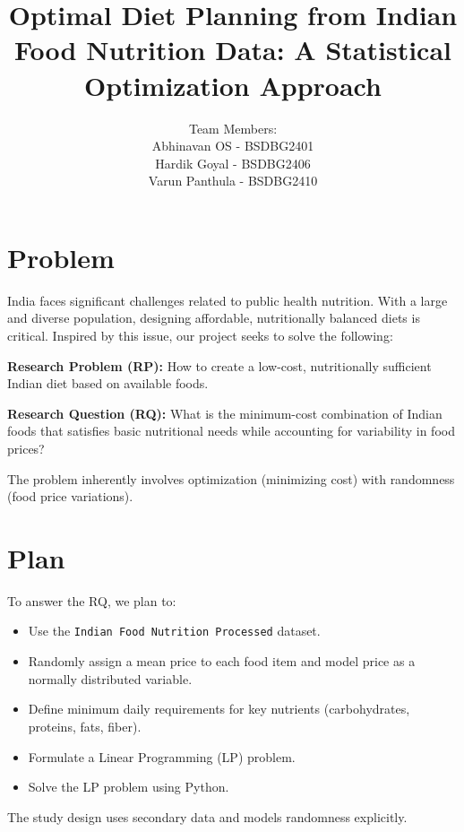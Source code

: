 \documentclass{article}
\title{Optimal Diet Planning from Indian Food Nutrition Data: A Statistical Optimization Approach}
\author{Team Members: \\ Abhinavan OS - BSDBG2401 \\ Hardik Goyal - BSDBG2406 \\ Varun Panthula - BSDBG2410}
\begin{document}
\maketitle

\section*{Problem}
India faces significant challenges related to public health nutrition. With a large and diverse population, designing affordable, nutritionally balanced diets is critical. Inspired by this issue, our project seeks to solve the following:

\textbf{Research Problem (RP):} How to create a low-cost, nutritionally sufficient Indian diet based on available foods.

\textbf{Research Question (RQ):} What is the minimum-cost combination of Indian foods that satisfies basic nutritional needs while accounting for variability in food prices?

The problem inherently involves optimization (minimizing cost) with randomness (food price variations).

\section*{Plan}
To answer the RQ, we plan to:
\begin{itemize}
    \item Use the \texttt{Indian Food Nutrition Processed} dataset.
    \item Randomly assign a mean price to each food item and model price as a normally distributed variable.
    \item Define minimum daily requirements for key nutrients (carbohydrates, proteins, fats, fiber).
    \item Formulate a Linear Programming (LP) problem.
    \item Solve the LP problem using Python.
\end{itemize}
The study design uses secondary data and models randomness explicitly.
\end{document}
